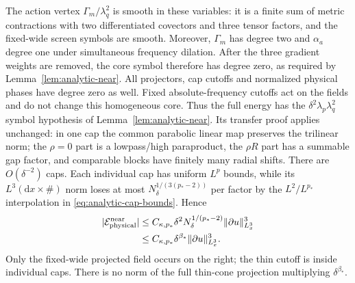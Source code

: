 \documentclass[11pt,a4paper]{article}
\numberwithin{equation}{section}
\newcommand{\dd}{\mathrm d}
\theoremstyle{definition}
\begin{document}
The action vertex $\Gamma_m/\lambda_q^2$ is smooth in these variables: it is a
finite sum of metric contractions with two differentiated covectors
and three tensor factors, and the fixed-wide screen symbols are smooth.
Moreover, $\Gamma_m$ has degree two and $\alpha_a$ degree one under
simultaneous frequency dilation. After the three gradient weights are
removed, the core symbol therefore has degree zero, as required by
Lemma~\ref{lem:analytic-near}. All projectors, cap cutoffs and normalized
physical phases have degree zero as well. Fixed absolute-frequency
cutoffs act on the fields and do not change this homogeneous core.
Thus the full energy has the $\delta^2\lambda_p\lambda_q^2$ symbol hypothesis of
Lemma~\ref{lem:analytic-near}. Its transfer proof applies unchanged: in
one cap the common parabolic linear map preserves the trilinear norm;
the $\rho=0$ part is a lowpass/high paraproduct, the $\rho R$ part has
a summable gap factor, and comparable blocks have finitely many radial
shifts. There are $O(\delta^{-2})$ caps. Each individual cap has uniform
$L^p$ bounds, while its $L^3(\dd x\times\#)$ norm loses at most
$N_\delta^{1/(3(p_*-2))}$ per factor by the $L^2/L^{p_*}$ interpolation
in \eqref{eq:analytic-cap-bounds}. Hence
\begin{equation}\label{eq:var-near-bound}
\begin{split}
|\mathcal E^{\mathrm{near}}_{\rm physical}|
&\leq C_{\kappa,p_*}\delta^2N_\delta^{1/(p_*-2)}
                         \|\partial u\|_{L^3_x}^3\\
&\leq C_{\kappa,p_*}\delta^{\beta_*}\|\partial u\|_{L^3_x}^3.
\end{split}
\end{equation}
Only the fixed-wide projected field occurs on the right; the thin
cutoff is inside individual caps. There is no norm of the full
thin-cone projection multiplying $\delta^{\beta_*}$.
\end{document}
